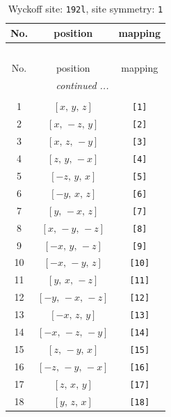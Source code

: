 \documentclass[fleqn,8pt]{jsarticle}
\begin{document}
\begin{longtable}{ccc}
\caption{Wyckoff site: {\tt 192l}, site symmetry: {\tt 1}}
 \\
 \hline \hline
No. & position & mapping \\ \hline \endfirsthead

\multicolumn{2}{l}{\tablename\ \thetable{}} \\
 \hline \hline
No. & position & mapping \\ \hline \endhead

 \hline \hline
\multicolumn{2}{r}{\footnotesize\it continued ...} \\ \endfoot

 \hline \hline
\multicolumn{2}{r}{} \\ \endlastfoot

1 & $\left[ x,\, y,\, z \right]$ & {\tt [1]} \\ \hline
2 & $\left[ x,\, - z,\, y \right]$ & {\tt [2]} \\ \hline
3 & $\left[ x,\, z,\, - y \right]$ & {\tt [3]} \\ \hline
4 & $\left[ z,\, y,\, - x \right]$ & {\tt [4]} \\ \hline
5 & $\left[ - z,\, y,\, x \right]$ & {\tt [5]} \\ \hline
6 & $\left[ - y,\, x,\, z \right]$ & {\tt [6]} \\ \hline
7 & $\left[ y,\, - x,\, z \right]$ & {\tt [7]} \\ \hline
8 & $\left[ x,\, - y,\, - z \right]$ & {\tt [8]} \\ \hline
9 & $\left[ - x,\, y,\, - z \right]$ & {\tt [9]} \\ \hline
10 & $\left[ - x,\, - y,\, z \right]$ & {\tt [10]} \\ \hline
11 & $\left[ y,\, x,\, - z \right]$ & {\tt [11]} \\ \hline
12 & $\left[ - y,\, - x,\, - z \right]$ & {\tt [12]} \\ \hline
13 & $\left[ - x,\, z,\, y \right]$ & {\tt [13]} \\ \hline
14 & $\left[ - x,\, - z,\, - y \right]$ & {\tt [14]} \\ \hline
15 & $\left[ z,\, - y,\, x \right]$ & {\tt [15]} \\ \hline
16 & $\left[ - z,\, - y,\, - x \right]$ & {\tt [16]} \\ \hline
17 & $\left[ z,\, x,\, y \right]$ & {\tt [17]} \\ \hline
18 & $\left[ y,\, z,\, x \right]$ & {\tt [18]} \\ \hline

\end{longtable}
\end{document}
